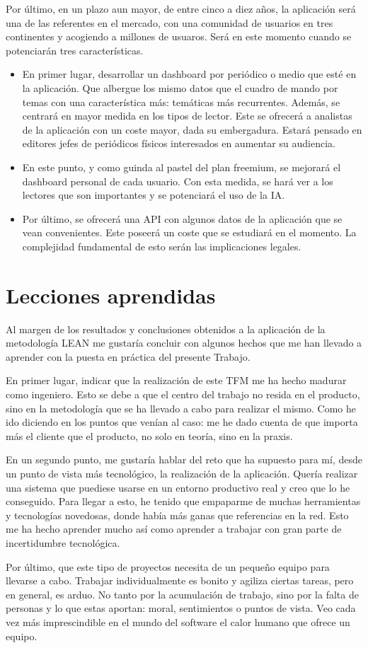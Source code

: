 Por último, en un plazo aun mayor, de entre cinco a diez años, la aplicación será una de las referentes en el mercado, con una comunidad de usuarios en tres continentes y acogiendo a millones de usuaros. Será en este momento cuando se potenciarán tres características.

\begin{itemize}
    \item En primer lugar, desarrollar un dashboard por periódico o medio que esté en la aplicación. Que albergue los mismo datos que el cuadro de mando por temas con una característica más: temáticas más recurrentes. Además, se centrará en mayor medida en los tipos de lector. Este se ofrecerá a analistas de la aplicación con un coste mayor, dada su embergadura. Estará pensado en editores jefes de periódicos físicos interesados en aumentar su audiencia.
    \item En este punto, y como guinda al pastel del plan freemium, se mejorará el dashboard personal de cada usuario. Con esta medida, se hará ver a los lectores que son importantes y se potenciará el uso de la IA.
    \item Por último, se ofrecerá una API con algunos datos de la aplicación que se vean convenientes. Este poseerá un coste que se estudiará en el momento. La complejidad fundamental de esto serán las implicaciones legales.
\end{itemize}

\section{Lecciones aprendidas}\label{sec:lecciones_aprendidas}

Al margen de los resultados y conclusiones obtenidos a la aplicación de la metodología LEAN me gustaría concluir con algunos hechos que me han llevado a aprender con la puesta en práctica del presente Trabajo.

En primer lugar, indicar que la realización de este TFM me ha hecho madurar como ingeniero. Esto se debe a que el centro del trabajo no resida en el producto, sino en la metodología que se ha llevado a cabo para realizar el mismo. Como he ido diciendo en los puntos que venían al caso: me he dado cuenta de que importa más el cliente que el producto, no solo en teoría, sino en la praxis.

En un segundo punto, me gustaría hablar del reto que ha supuesto para mí, desde un punto de vista más tecnológico, la realización de la aplicación. Quería realizar una sistema que puediese usarse en un entorno productivo real y creo que lo he conseguido. Para llegar a esto, he tenido que empaparme de muchas herramientas y tecnologías novedosas, donde había más ganas que referencias en la red. Esto me ha hecho aprender mucho así como aprender a trabajar con gran parte de incertidumbre tecnológica.

Por último, que este tipo de proyectos necesita de un pequeño equipo para llevarse a cabo. Trabajar individualmente es bonito y agiliza ciertas tareas, pero en general, es arduo. No tanto por la acumulación de trabajo, sino por la falta de personas y lo que estas aportan: moral, sentimientos o puntos de vista. Veo cada vez más imprescindible en el mundo del software el calor humano que ofrece un equipo.